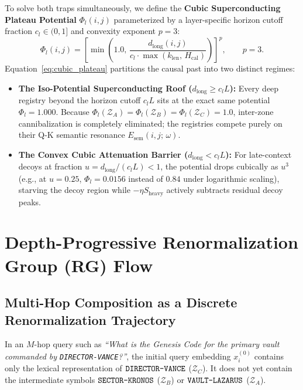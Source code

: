 \documentclass[11pt,letterpaper]{article}
\theoremstyle{definition}
\begin{document}
To solve both traps simultaneously, we define the \textbf{Cubic Superconducting Plateau Potential} $\Phi_l(i,j)$ parameterized by a layer-specific horizon cutoff fraction $c_l \in (0, 1]$ and convexity exponent $p = 3$:
\begin{equation}
    \Phi_l(i, j) = \left[\min\!\left(1.0, \, \frac{d_{\text{long}}(i, j)}{c_l \cdot \max(k_{\text{len}},\, H_{\text{cal}})}\right)\right]^p, \qquad p = 3.
    \label{eq:cubic_plateau}
\end{equation}
Equation~\eqref{eq:cubic_plateau} partitions the causal past into two distinct regimes:
\begin{itemize}
    \item \textbf{The Iso-Potential Superconducting Roof ($d_{\text{long}} \ge c_l L$):} Every deep registry beyond the horizon cutoff $c_l L$ sits at the exact same potential $\Phi_l = 1.000$. Because $\Phi_l(\mathcal{Z}_A) = \Phi_l(\mathcal{Z}_B) = \Phi_l(\mathcal{Z}_C) = 1.0$, inter-zone cannibalization is completely eliminated; the registries compete purely on their Q-K semantic resonance $E_{\text{sem}}(i, j;\, \omega)$.
    \item \textbf{The Convex Cubic Attenuation Barrier ($d_{\text{long}} < c_l L$):} For late-context decoys at fraction $u = d_{\text{long}} / (c_l L) < 1$, the potential drops cubically as $u^3$ (e.g., at $u = 0.25$, $\Phi_l = 0.0156$ instead of $0.84$ under logarithmic scaling), starving the decoy region while $-\eta S_{\text{heavy}}$ actively subtracts residual decoy peaks.
\end{itemize}

\section{Depth-Progressive Renormalization Group (RG) Flow}

\subsection{Multi-Hop Composition as a Discrete Renormalization Trajectory}
In an $M$-hop query such as \emph{``What is the Genesis Code for the primary vault commanded by \texttt{DIRECTOR-VANCE}?''}, the initial query embedding $x_i^{(0)}$ contains only the lexical representation of $\text{\texttt{DIRECTOR-VANCE}}$ ($\mathcal{Z}_C$). It does not yet contain the intermediate symbols $\text{\texttt{SECTOR-KRONOS}}$ ($\mathcal{Z}_B$) or $\text{\texttt{VAULT-LAZARUS}}$ ($\mathcal{Z}_A$).
\end{document}
